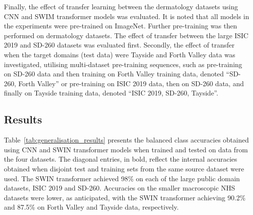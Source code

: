 Finally, the effect of transfer learning between the dermatology datasets using CNN and SWIM transformer models was evaluated. It is noted that all models in the experiments were pre-trained on ImageNet. Further pre-training was then performed on dermatology datasets. The effect of transfer between the large ISIC 2019 and SD-260 datasets was evaluated first. Secondly, the effect of transfer when the target domains (test data) were Tayside and Forth Valley data was investigated, utilising multi-dataset pre-training sequences, such as pre-training on SD-260 data and then training on Forth Valley training data, denoted “SD-260, Forth Valley” or pre-training on ISIC 2019 data, then on SD-260 data, and finally on Tayside training data, denoted “ISIC 2019, SD-260, Tayside”.


\subsection{Results}
\label{subsec:generalisation_results}
Table~\ref{tab:generalisation_results} presents the balanced class accuracies obtained using CNN and SWIN transformer models when trained and tested on data from the four datasets. The diagonal entries, in bold, reflect the internal accuracies obtained when disjoint test and training sets from the same source dataset were used. The SWIN transformer achieved 98\% on each of the large public domain datasets, ISIC 2019 and SD-260. Accuracies on the smaller macroscopic NHS datasets were lower, as anticipated, with the SWIN transformer achieving 90.2\% and 87.5\% on Forth Valley and Tayside data, respectively.

\begin{table}[h]
	\centering
	\caption{Class-balanced accuracy when training and testing on the various datasets.}
	\label{tab:generalisation_results}
\end{table}

